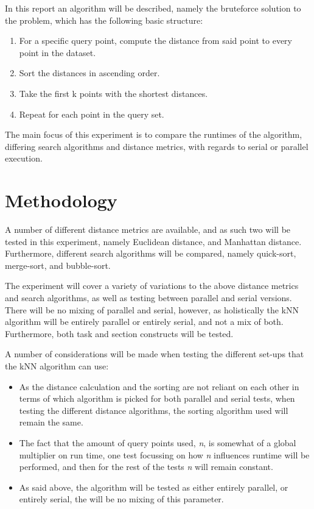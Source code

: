\documentclass[a4paper,twoside,11pt]{report}
\begin{document}
In this report an algorithm will be described, namely the bruteforce solution to the problem, which has the following basic structure:
\begin{enumerate}
	\item For a specific query point, compute the distance from said point to every point in the dataset.
	\item Sort the distances in ascending order.
	\item Take the first k points with the shortest distances.
	\item Repeat for each point in the query set.
\end{enumerate}

The main focus of this experiment is to compare the runtimes of the algorithm, differing search algorithms and distance metrics, with regards to serial or parallel execution.

\section*{Methodology}
A number of different distance metrics are available, and as such two will be tested in this experiment, namely Euclidean distance, and Manhattan distance. Furthermore, different search algorithms will be compared, namely quick-sort, merge-sort, and bubble-sort.

The experiment will cover a variety of variations to the above distance metrics and search algorithms, as well as testing between parallel and serial versions. There will be no mixing of parallel and serial, however, as holistically the kNN algorithm will be entirely parallel or entirely serial, and not a mix of both. Furthermore, both task and section constructs will be tested.

A number of considerations will be made when testing the different set-ups that the kNN algorithm can use:
\begin{itemize}
	\item As the distance calculation and the sorting are not reliant on each other in terms of which algorithm is picked for both parallel and serial tests, when testing the different distance algorithms, the sorting algorithm used will remain the same.
	\item The fact that the amount of query points used, \textit{n}, is somewhat of a global multiplier on run time, one test focussing on how \textit{n} influences runtime will be performed, and then for the rest of the tests \textit{n} will remain constant.
	\item As said above, the algorithm will be tested as either entirely parallel, or entirely serial, the will be no mixing of this parameter.
\end{itemize}
\end{document}

